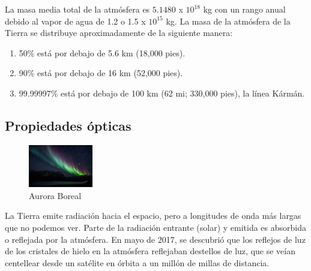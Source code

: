 \documentclass{article} %
\begin{document}
La masa media total de la atmósfera es $5.1480$ x $10^{18}$ kg con un rango anual debido al vapor de agua de 1.2 o 1.5 x $10^{15}$ kg. La masa de la atmósfera de la Tierra se distribuye aproximadamente de la siguiente manera: 
\begin{enumerate}
\item 50\% está por debajo de 5.6 km (18,000 pies).
\item 90\% está por debajo de 16 km (52,000 pies).
\item 99.99997\% está por debajo de 100 km (62 mi; 330,000 pies), la línea Kármán. 
\end{enumerate}

\subsection{Propiedades ópticas}
\begin{figure}
  \centering
  \includegraphics[width=0.25\textwidth]{aurora.jpg}
  \caption{Aurora Boreal}
  \label{fig:aurora}
\end{figure}
La Tierra emite radiación hacia el espacio, pero a longitudes de onda más largas que no podemos ver. Parte de la radiación entrante (solar) y emitida es absorbida o reflejada por la atmósfera. En mayo de 2017, se descubrió que los reflejos de luz de los cristales de hielo en la atmósfera reflejaban destellos de luz, que se veían centellear desde un satélite en órbita a un millón de millas de distancia.
\end{document}
